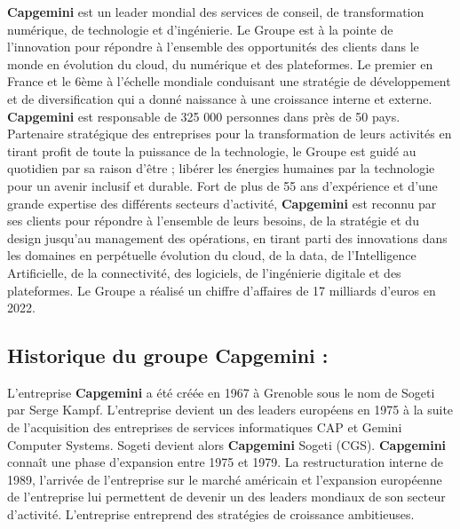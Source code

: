 \documentclass[12pt,a4paper,twoside]{report}
\begin{document}
\textbf{Capgemini} est un leader mondial des services de conseil, de transformation numérique, de technologie et d'ingénierie. Le Groupe est à la pointe de l'innovation pour répondre à l'ensemble des opportunités des clients dans le monde en évolution du cloud, du numérique et des plateformes. Le
premier en France et le 6ème à l'échelle mondiale conduisant une
stratégie de développement et de diversification qui a donné naissance à
une croissance interne et externe. \textbf{Capgemini} est responsable de
325 000 personnes dans près de 50 pays. Partenaire stratégique des
entreprises pour la transformation de leurs activités en tirant profit
de toute la puissance de la technologie, le Groupe est guidé au
quotidien par sa raison d'être ; libérer les énergies humaines par la
technologie pour un avenir inclusif et durable. Fort de plus de 55 ans
d'expérience et d'une grande expertise des différents secteurs
d'activité, \textbf{Capgemini} est reconnu par ses clients pour répondre
à l'ensemble de leurs besoins, de la stratégie et du design jusqu'au
management des opérations, en tirant parti des innovations dans les
domaines en perpétuelle évolution du cloud, de la data, de
l'Intelligence Artificielle, de la connectivité, des logiciels, de
l'ingénierie digitale et des plateformes. Le Groupe a réalisé un chiffre
d'affaires de 17 milliards d'euros en 2022.

\hypertarget{historique-du-groupe-capgemini}{%
\subsection{Historique du groupe Capgemini
:}\label{historique-du-groupe-capgemini}}

L'entreprise \textbf{Capgemini} a été créée en 1967 à Grenoble sous le
nom de Sogeti par Serge Kampf. L'entreprise devient un des leaders
européens en 1975 à la suite de l'acquisition des entreprises de
services informatiques CAP et Gemini Computer Systems. Sogeti devient
alors \textbf{Capgemini} Sogeti (CGS). \textbf{Capgemini} connaît une
phase d'expansion entre 1975 et 1979. La restructuration interne de
1989, l'arrivée de l'entreprise sur le marché américain et l'expansion
européenne de l'entreprise lui permettent de devenir un des leaders
mondiaux de son secteur d'activité. L'entreprise entreprend des
stratégies de croissance ambitieuses.
\end{document}
